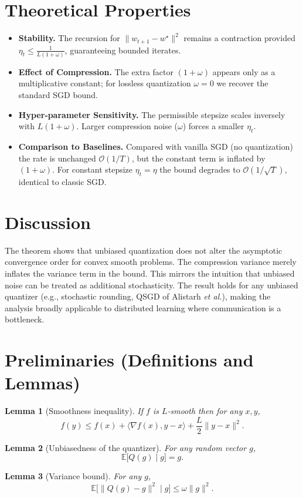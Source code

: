 \documentclass{article}
\newtheorem{lemma}{Lemma}
\begin{document}
\section*{Theoretical Properties}
\begin{itemize}
\item \textbf{Stability.} The recursion for $\|w_{t+1}-w^\star\|^2$ remains a contraction provided $\eta_t\le \frac{1}{L(1+\omega)}$, guaranteeing bounded iterates.
\item \textbf{Effect of Compression.} The extra factor $(1+\omega)$ appears only as a multiplicative constant; for lossless quantization $\omega=0$ we recover the standard SGD bound.
\item \textbf{Hyper‑parameter Sensitivity.} The permissible stepsize scales inversely with $L(1+\omega)$. Larger compression noise ($\omega$) forces a smaller $\eta_t$.
\item \textbf{Comparison to Baselines.} Compared with vanilla SGD (no quantization) the rate is unchanged $\mathcal{O}(1/T)$, but the constant term is inflated by $(1+\omega)$. For constant stepsize $\eta_t=\eta$ the bound degrades to $\mathcal{O}(1/\sqrt{T})$, identical to classic SGD.
\end{itemize}

\section*{Discussion}
The theorem shows that unbiased quantization does not alter the asymptotic convergence order for convex smooth problems. The compression variance merely inflates the variance term in the bound. This mirrors the intuition that unbiased noise can be treated as additional stochasticity. The result holds for any unbiased quantizer (e.g., stochastic rounding, QSGD of Alistarh \emph{et al.}), making the analysis broadly applicable to distributed learning where communication is a bottleneck.

\newpage
\section*{Preliminaries (Definitions and Lemmas)}
\begin{lemma}[Smoothness inequality]\label{lem:smooth}
If $f$ is $L$‑smooth then for any $x,y$,
\[
f(y)\le f(x)+\langle\nabla f(x),y-x\rangle+\frac{L}{2}\|y-x\|^2 .
\]
\end{lemma}
\begin{lemma}[Unbiasedness of the quantizer]\label{lem:unbiased}
For any random vector $g$, 
\[
\mathbb{E}\!\big[Q(g)\mid g\big]=g .
\]
\end{lemma}
\begin{lemma}[Variance bound]\label{lem:var}
For any $g$,
\[
\mathbb{E}\!\big[\|Q(g)-g\|^2\mid g\big]\le \omega\|g\|^2 .
\]
\end{lemma}
\end{document}
